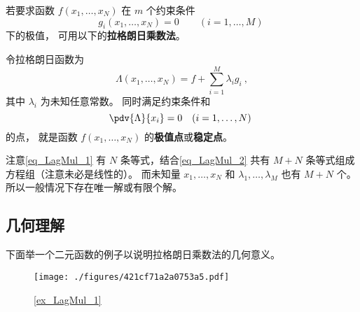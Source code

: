 

若要求函数 $f(x_1,\dots, x_N)$ 在 $m$ 个约束条件
\begin{equation}\label{eq_LagMul_2}
g_i(x_1, \dots, x_N) = 0 \qquad (i = 1,\dots, M)~
\end{equation}
下的极值， 可用以下的\textbf{拉格朗日乘数法}。

令拉格朗日函数为
\begin{equation}
\Lambda(x_1,\dots, x_N) = f + \sum_{i=1}^M \lambda_i g_i~,
\end{equation} 
其中 $\lambda_i$ 为未知任意常数。 同时满足约束条件和
\begin{equation}\label{eq_LagMul_1}
\pdv{\Lambda}{x_i} = 0 \quad (i = 1,\dots, N)~
\end{equation}
的点， 就是函数 $f(x_1, \dots, x_N)$ 的\textbf{极值点}或\textbf{稳定点}。

注意\autoref{eq_LagMul_1} 有 $N$ 条等式，结合\autoref{eq_LagMul_2} 共有 $M+N$ 条等式组成方程组（注意未必是线性的）。 而未知量 $x_1,\dots,x_N$ 和 $\lambda_1,\dots,\lambda_M$ 也有 $M+N$ 个。 所以一般情况下存在唯一解或有限个解。

\subsection{几何理解}

下面举一个二元函数的例子以说明拉格朗日乘数法的几何意义。

\begin{figure}[ht]
\centering
\texttt{[image: ./figures/421cf71a2a0753a5.pdf]}
\caption{\autoref{ex_LagMul_1} } \label{fig_LagMul_1}
\end{figure}

